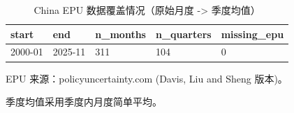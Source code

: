 \begin{table}[!htbp]
\centering
\small
\caption{China EPU 数据覆盖情况（原始月度 -> 季度均值）}
\label{tab:epu_coverage}
\begin{threeparttable}
\begin{tabular}{@{}lllll@{}}
\toprule
start & end & n_months & n_quarters & missing_epu \\
\midrule
2000-01 & 2025-11 & 311 & 104 & 0 \\
\bottomrule
\end{tabular}
\begin{tablenotes}[flushleft]
\footnotesize
\item EPU 来源：policyuncertainty.com (Davis, Liu and Sheng 版本)。
\item 季度均值采用季度内月度简单平均。
\end{tablenotes}
\end{threeparttable}
\end{table}
